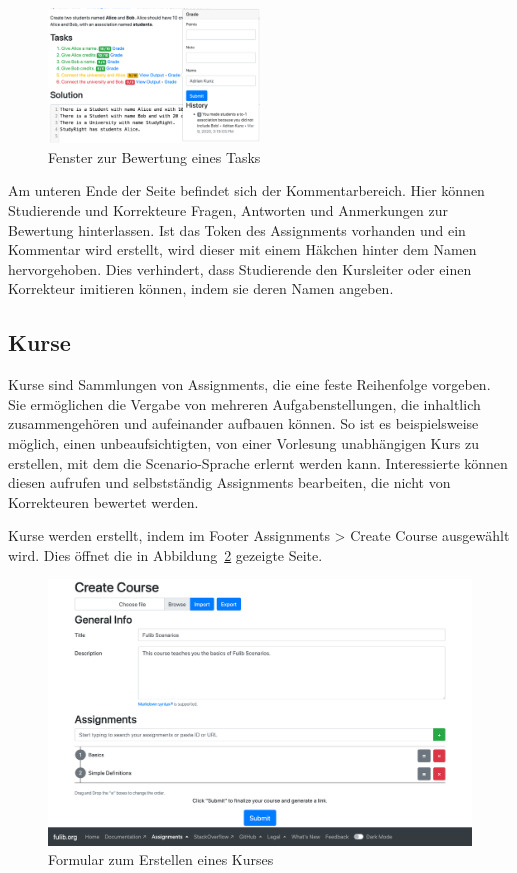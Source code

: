 \begin{figure}
    \centering
    \includegraphics[width=0.5\textwidth]{chapter/fulib.org/img/grade-popover.png}
    \caption{Fenster zur Bewertung eines Tasks}
    \label{fig:grade-popover}
\end{figure}

Am unteren Ende der Seite befindet sich der Kommentarbereich.
Hier können Studierende und Korrekteure Fragen, Antworten und Anmerkungen zur Bewertung hinterlassen.
Ist das Token des Assignments vorhanden und ein Kommentar wird erstellt, wird dieser mit einem Häkchen hinter dem Namen hervorgehoben.
Dies verhindert, dass Studierende den Kursleiter oder einen Korrekteur imitieren können, indem sie deren Namen angeben.

\subsection{Kurse}\label{subsec:courses}

Kurse sind Sammlungen von Assignments, die eine feste Reihenfolge vorgeben.
Sie ermöglichen die Vergabe von mehreren Aufgabenstellungen, die inhaltlich zusammengehören und aufeinander aufbauen können.
So ist es beispielsweise möglich, einen unbeaufsichtigten, von einer Vorlesung unabhängigen Kurs zu erstellen, mit dem die Scenario-Sprache erlernt werden kann.
Interessierte können diesen aufrufen und selbstständig Assignments bearbeiten, die nicht von Korrekteuren bewertet werden.

Kurse werden erstellt, indem im Footer Assignments > Create Course ausgewählt wird.
Dies öffnet die in Abbildung~\ref{fig:create-course} gezeigte Seite.

\begin{figure}
    \centering
    \includegraphics[width=\textwidth]{chapter/fulib.org/img/create-course.png}
    \caption{Formular zum Erstellen eines Kurses}
    \label{fig:create-course}
\end{figure}

